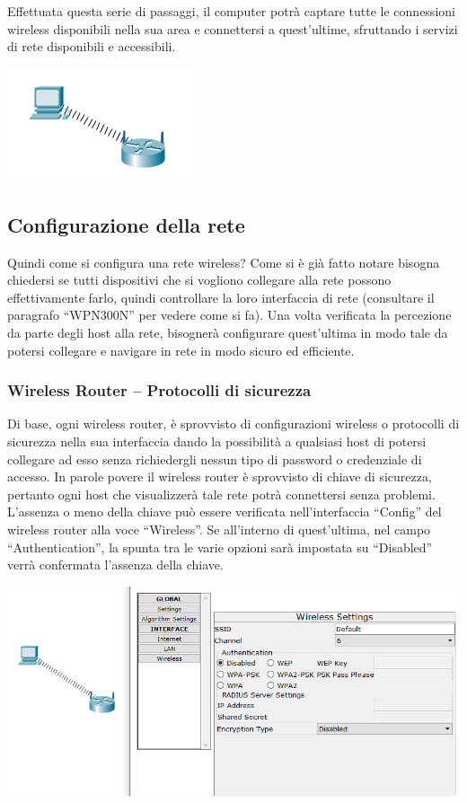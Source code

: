 Effettuata questa serie di passaggi, il computer potrà captare tutte le connessioni wireless disponibili nella sua area e connettersi a quest’ultime, sfruttando i servizi di rete disponibili e accessibili.

\begin{center}
    \includegraphics[width=0.4\linewidth]{images/08.wireless/06.png}
\end{center}

\subsection{Configurazione della rete}

Quindi come si configura una rete wireless? Come si è già fatto notare bisogna chiedersi se tutti dispositivi che si vogliono collegare alla rete possono effettivamente farlo, quindi controllare la loro interfaccia di rete (consultare il paragrafo “WPN300N” per vedere come si fa). Una volta verificata la percezione da parte degli host alla rete, bisognerà configurare quest’ultima in modo tale da potersi collegare e navigare in rete in modo sicuro ed efficiente.

\subsubsection{Wireless Router – Protocolli di sicurezza}

Di base, ogni wireless router, è sprovvisto di configurazioni wireless o protocolli di sicurezza nella sua interfaccia dando la possibilità a qualsiasi host di potersi collegare ad esso senza richiedergli nessun tipo di password o credenziale di accesso. In parole povere il wireless router è sprovvisto di chiave di sicurezza, pertanto ogni host che visualizzerà tale rete potrà connettersi senza problemi. L’assenza o meno della chiave può essere verificata nell’interfaccia “Config” del wireless router alla voce “Wireless”. Se all’interno di quest’ultima, nel campo “Authentication”, la spunta tra le varie opzioni sarà impostata su “Disabled” verrà confermata l’assenza della chiave.

\begin{center}
    \includegraphics[width=\linewidth]{images/08.wireless/07.png}
\end{center}

